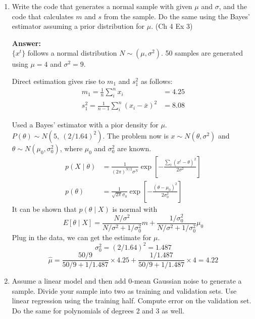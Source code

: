 \documentclass{article}
\begin{document}
\begin{enumerate}
    \item Write the code that generates a normal sample with given $\mu$ and $\sigma$, and the code that calculates $m$ and $s$ from the sample. Do the same using the Bayes’ estimator assuming a prior distribution for $\mu$. (Ch 4 Ex 3)%
    
    \textbf{Answer:} \\
    $\{x^t\}$ follows a normal distribution $N \sim (\mu, \sigma^2)$. 50 samples are generated using $\mu=4$ and $\sigma^2=9$.

    Direct estimation gives rise to $m_1$ and $s_1^2$ as follows:
    $$\begin{aligned}
    m_1 = \frac{1}{n} \sum_i^n x_i &= 4.25\\
    s_1^2 = \frac{1}{n-1} \sum_i^n (x_i - \bar{x})^2 &= 8.08
    \end{aligned}
    $$

    Used a Bayes' estimator with a pior density for $\mu$. $P(\theta) \sim N(5,~(2/1.64)^2)$. The problem now is $x \sim N(\theta, \sigma^2)$ and $\theta \sim N(\mu_0,\sigma_0^2)$, where $\mu_0$ and $\sigma_0^2$ are known.
    $$
    \begin{aligned}
    p(X \mid \theta) &=\frac{1}{(2 \pi)^{N / 2} \sigma^N} \exp \left[-\frac{\sum_t\left(x^t-\theta\right)^2}{2 \sigma^2}\right] \\
    p(\theta) &=\frac{1}{\sqrt{2 \pi} \sigma_0} \exp \left[-\frac{\left(\theta-\mu_0\right)^2}{2 \sigma_0^2}\right]
    \end{aligned}
    $$
    It can be shown that $p(\theta \mid X)$ is normal with
    $$
    E[\theta \mid X]=\frac{N / \sigma^2}{N / \sigma^2+1 / \sigma_0^2} m+\frac{1 / \sigma_0^2}{N / \sigma^2+1 / \sigma_0^2} \mu_0
    $$
    Plug in the data, we can get the estimate for $\mu$.
    $$
    \sigma_0^2 = (2/1.64)^2 = 1.487
    $$
    $$
    \hat{\mu} = \frac{50 / 9}{50 / 9 + 1 / 1.487} \times 4.25 + \frac{1 / 1.487}{50 / 9 + 1 / 1.487} \times 4 = 4.22
    $$
    \item  Assume a linear model and then add $0$-mean Gaussian noise to generate a sample. Divide your sample into two as training and validation sets. Use linear regression using the training half. Compute error on the validation set. Do the same for polynomials of degrees 2 and 3 as well. %
    

\end{enumerate}
\end{document}
